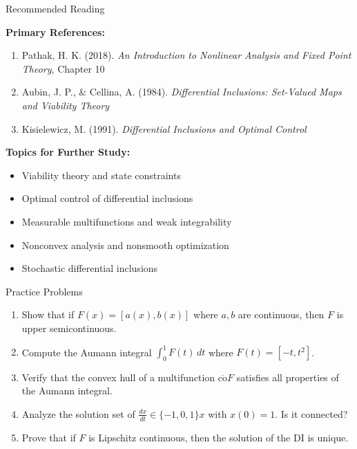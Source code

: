 \documentclass[aspectratio=169,10pt]{beamer}
\theoremstyle{definition}
\begin{document}
\begin{frame}{Recommended Reading}

\textbf{Primary References:}
\begin{enumerate}
    \item Pathak, H. K. (2018). \textit{An Introduction to Nonlinear Analysis and Fixed Point Theory}, Chapter 10

    \item Aubin, J. P., \& Cellina, A. (1984). \textit{Differential Inclusions: Set-Valued Maps and Viability Theory}

    \item Kisielewicz, M. (1991). \textit{Differential Inclusions and Optimal Control}
\end{enumerate}

\vspace{0.3cm}

\textbf{Topics for Further Study:}
\begin{itemize}
    \item Viability theory and state constraints
    \item Optimal control of differential inclusions
    \item Measurable multifunctions and weak integrability
    \item Nonconvex analysis and nonsmooth optimization
    \item Stochastic differential inclusions
\end{itemize}

\end{frame}

\begin{frame}{Practice Problems}

\begin{enumerate}
    \item Show that if $F(x) = [a(x), b(x)]$ where $a, b$ are continuous, then $F$ is upper semicontinuous.

    \item Compute the Aumann integral $\int_0^1 F(t) \, dt$ where $F(t) = [-t, t^2]$.

    \item Verify that the convex hull of a multifunction $\overline{\text{co}} F$ satisfies all properties of the Aumann integral.

    \item Analyze the solution set of $\frac{dx}{dt} \in \{-1, 0, 1\} x$ with $x(0) = 1$. Is it connected?

    \item Prove that if $F$ is Lipschitz continuous, then the solution of the DI is unique.
\end{enumerate}

\end{frame}
\end{document}
